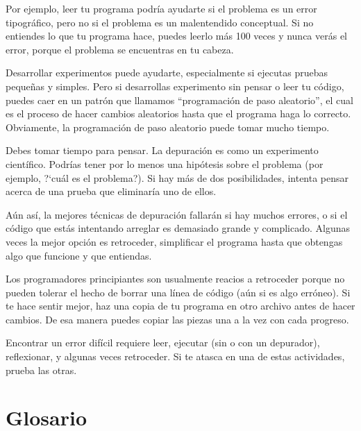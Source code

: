 Por ejemplo, leer tu programa podría ayudarte si el problema es
un error tipográfico, pero no si el problema es un malentendido 
conceptual. Si no entiendes lo que tu programa hace, puedes leerlo
más 100 veces y nunca verás el error, porque el problema se encuentras en
tu cabeza.


Desarrollar experimentos puede ayudarte, especialmente si ejecutas
pruebas pequeñas y simples. Pero si desarrollas experimento sin pensar 
o leer tu código, puedes caer en un patrón que llamamos ``programación de 
paso aleatorio'', el cual es el proceso de hacer cambios aleatorios hasta
que el programa haga lo correcto. Obviamente, la programación de paso aleatorio
puede tomar mucho tiempo.

Debes tomar tiempo para pensar. La depuración es como un experimento científico.
Podrías tener por lo menos una hipótesis sobre el problema (por ejemplo, 
?`cuál es el problema?). Si hay más de dos posibilidades, intenta pensar
acerca de una prueba que eliminaría uno de ellos.

Aún así, la mejores técnicas de depuración fallarán si hay muchos errores,
o si el código que estás intentando arreglar es demasiado grande y 
complicado. Algunas veces la mejor opción es retroceder, simplificar el
programa hasta que obtengas algo que funcione y que entiendas.

Los programadores principiantes son usualmente reacios a retroceder
porque no pueden tolerar el hecho de borrar una línea de código 
(aún si es algo erróneo). Si te hace sentir mejor, haz una copia de
tu programa en otro archivo antes de hacer cambios. De esa manera
puedes copiar las piezas una a la vez con cada progreso.

Encontrar un error difícil requiere leer, ejecutar (sin o con 
un depurador), reflexionar, y algunas veces retroceder. Si te atasca
en una de estas actividades, prueba las otras. 


\section{Glosario}


